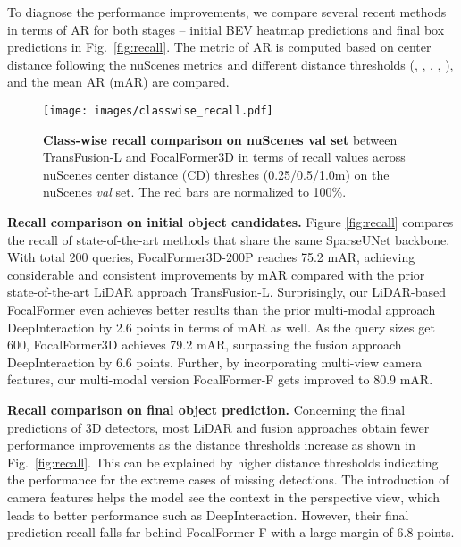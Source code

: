 \documentclass[10pt,twocolumn,letterpaper]{article}
\begin{document}
To diagnose the performance improvements, we compare several recent methods in terms of AR for both stages -- initial BEV heatmap predictions and final box predictions in Fig.~\ref{fig:recall}. The metric of AR is computed based on center distance following the nuScenes metrics and different distance thresholds (\eg, , , , ), and the mean AR (mAR) are compared. 

\begin{figure}[t]
	\begin{center}
		\texttt{[image: images/classwise\_recall.pdf]}
	\end{center}
	\caption{\textbf{Class-wise recall comparison on nuScenes val set} between TransFusion-L and FocalFormer3D in terms of recall values across nuScenes center distance (CD) threshes (0.25/0.5/1.0m) on the nuScenes \textit{val} set. The red bars are normalized to 100\%.}
	\label{fig:classwise recall}
\end{figure}

\vspace{2mm}
\noindent\textbf{Recall comparison on initial object candidates.}
Figure \ref{fig:recall} compares the recall of state-of-the-art methods that share the same SparseUNet backbone. With total 200 queries, FocalFormer3D-200P reaches 75.2 mAR, achieving considerable and consistent improvements by  mAR compared with the prior state-of-the-art LiDAR approach TransFusion-L. Surprisingly, our LiDAR-based FocalFormer even achieves better results than the prior multi-modal approach DeepInteraction by 2.6 points in terms of mAR as well. As the query sizes get 600, FocalFormer3D achieves 79.2 mAR, surpassing the fusion approach DeepInteraction by 6.6 points. Further, by incorporating multi-view camera features, our multi-modal version FocalFormer-F gets improved to 80.9 mAR.

\vspace{2mm}
\noindent\textbf{Recall comparison on final object prediction.}
Concerning the final predictions of 3D detectors, most LiDAR and fusion approaches obtain fewer performance improvements as the distance thresholds increase as shown in Fig.~\ref{fig:recall}. This can be explained by higher distance thresholds indicating the performance for the extreme cases of missing detections. The introduction of camera features helps the model see the context in the perspective view, which leads to better performance such as DeepInteraction. However, their final prediction recall falls far behind FocalFormer-F with a large margin of 6.8 points. 
\end{document}
